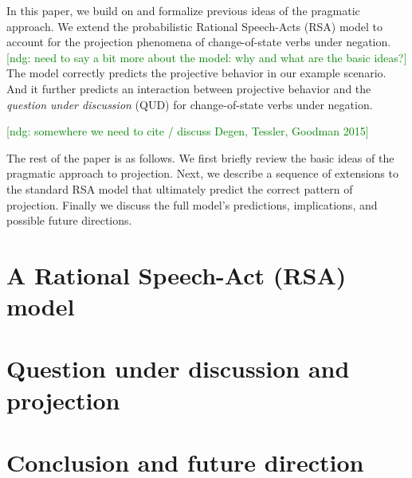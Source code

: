 \documentclass[10pt,letterpaper]{article}
\newcommand{\ndg}[1]{\textcolor{Green}{[ndg: #1]}}
\begin{document}
In this paper, we build on and formalize previous ideas of the pragmatic approach.
We extend the probabilistic Rational Speech-Acts (RSA) model
 \cite{FrankGoodman2012:Predicting-Pragmatic-Reasoning-,GoodmanStuhlmuller2013:Knowledge-and-I} to account for the projection phenomena of change-of-state verbs 
 under negation.
 \ndg{need to say a bit more about the model: why and what are the basic ideas?}
The model correctly predicts the projective behavior in our example scenario. 
And it further predicts an interaction between projective behavior and the  
 \emph{question under discussion} (QUD) \cite{Roberts2012:Information-Structure} for change-of-state verbs under negation.

\ndg{somewhere we need to cite / discuss Degen, Tessler, Goodman 2015}

The rest of the paper is as follows. We first briefly review the basic ideas of the pragmatic approach to projection. 
Next, we describe a sequence of extensions to the standard RSA model that ultimately predict the correct pattern of projection. 
Finally we discuss the full model's predictions, implications, and possible future directions.


\section{A Rational Speech-Act (RSA) model}
\label{sec:RSA}


\section{Question under discussion and projection}
\label{sec:Discussion}


\section{Conclusion and future direction}
\label{sec:Conclusion}









\setlength{\bibleftmargin}{.125in}
\setlength{\bibindent}{-\bibleftmargin}


\end{document}
